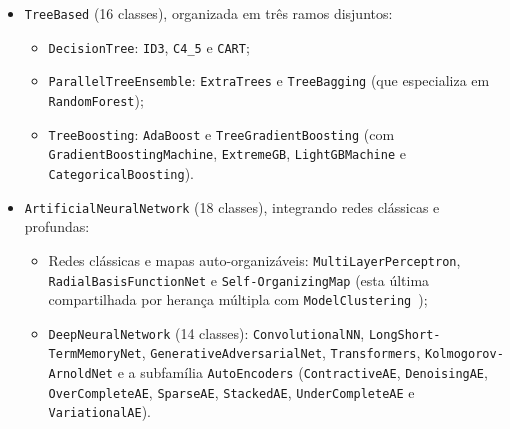 \documentclass[11pt,a4paper]{article}
\newcommand{\onto}[1]{\texttt{\small #1}}
\begin{document}
{\begin{itemize}[leftmargin=*,nosep]
\begin{itemize}[leftmargin=1.2em,nosep]
\begin{itemize}[leftmargin=1.2em,nosep]
          \item \onto{DeepLearningClustering}: \onto{DEC}, \onto{IDEC}, \onto{VaDE}, \onto{DCEC}, \onto{DCN} e \onto{Contrastive};
          \item \onto{SemiSupervisedClustering}: \onto{ConstrainedKMeans} e \onto{SemiSupervisedFuzzyCMeans}.
        \end{itemize}
      \item \onto{TreeBased} (16 classes), organizada em três ramos disjuntos:
        \begin{itemize}[leftmargin=1.2em,nosep]
          \item \onto{DecisionTree}: \onto{ID3}, \onto{C4\_5} e \onto{CART};
          \item \onto{ParallelTreeEnsemble}: \onto{ExtraTrees} e \onto{TreeBagging} (que especializa em \onto{RandomForest});
          \item \onto{TreeBoosting}: \onto{AdaBoost} e \onto{TreeGradientBoosting} (com \onto{GradientBoostingMachine}, \onto{ExtremeGB}, \onto{LightGBMachine} e \onto{CategoricalBoosting}).
        \end{itemize}
      \item \onto{ArtificialNeuralNetwork} (18 classes), integrando redes clássicas e profundas:
        \begin{itemize}[leftmargin=1.2em,nosep]
          \item Redes clássicas e mapas auto-organizáveis: \onto{MultiLayerPerceptron}, \onto{RadialBasisFunctionNet} e \onto{Self-OrganizingMap} (esta última compartilhada por herança múltipla com \onto{ModelClustering}~\cite{nagpal2013review});
          \item \onto{DeepNeuralNetwork} (14 classes): \onto{ConvolutionalNN}, \onto{LongShort-TermMemoryNet}, \onto{GenerativeAdversarialNet}, \onto{Transformers}, \onto{Kolmogorov-ArnoldNet} e a subfamília \onto{AutoEncoders} (\onto{ContractiveAE}, \onto{DenoisingAE}, \onto{OverCompleteAE}, \onto{SparseAE}, \onto{StackedAE}, \onto{UnderCompleteAE} e \onto{VariationalAE}).
        \end{itemize}
    \end{itemize}


\end{itemize}}
\end{document}
